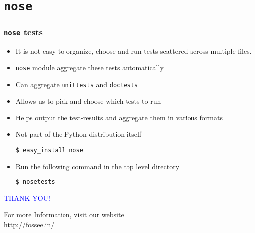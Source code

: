 \documentclass[12pt,presentation]{beamer}
\begin{document}
\section{\texttt{nose}}

\begin{frame}[fragile]
  \frametitle{\texttt{nose} tests}
  \begin{itemize}
  \item It is not easy to organize, choose and run tests scattered
    across multiple files. 
  \item \texttt{nose} module aggregate these tests automatically
  \item Can aggregate \texttt{unittests} and \texttt{doctests}
  \item Allows us to pick and choose which tests to run
  \item Helps output the test-results and aggregate them in various
    formats
  \item Not part of the Python distribution itself
\begin{lstlisting}
$ easy_install nose
\end{lstlisting} %
  \item Run the following command in the top level directory
\begin{lstlisting}
$ nosetests
\end{lstlisting} %
  \end{itemize}
\end{frame}

\begin{frame}

  \begin{block}{}
  \begin{center}
  \textcolor{blue}{\Large THANK YOU!} 
  \end{center}
  \end{block}
\begin{block}{}
  \begin{center}
    For more Information, visit our website\\
    \url{http://fossee.in/}
  \end{center}  
  \end{block}
\end{frame}
\end{document}
